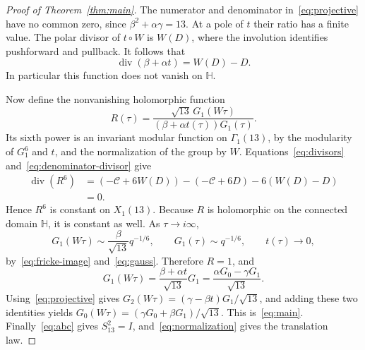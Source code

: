 \documentclass[10pt,a4paper]{amsart}
\newcommand{\HH}{\mathbb H}
\DeclareMathOperator{\divisor}{div}
\begin{document}
\begin{proof}[Proof of Theorem~\ref{thm:main}]
The numerator and denominator in~\eqref{eq:projective} have no common zero, since $\beta^2+\alpha\gamma=13$. At a pole of $t$ their ratio has a finite value. The polar divisor of $t\circ W$ is $W(D)$, where the involution identifies pushforward and pullback. It follows that
\begin{equation}\label{eq:denominator-divisor}
 \divisor(\beta+\alpha t)=W(D)-D.
\end{equation}
In particular this function does not vanish on $\HH$.

Now define the nonvanishing holomorphic function
\[
 R(\tau)=\frac{\sqrt{13}\,G_1(W\tau)}{(\beta+\alpha t(\tau))G_1(\tau)}.
\]
Its sixth power is an invariant modular function on $\Gamma_1(13)$, by the modularity of $G_1^6$ and $t$, and the normalization of the group by $W$. Equations~\eqref{eq:divisors} and~\eqref{eq:denominator-divisor} give
\begin{align*}
 \divisor(R^6)
 &=(-\mathcal C+6W(D))-(-\mathcal C+6D)-6(W(D)-D)\\
 &=0.
\end{align*}
Hence $R^6$ is constant on $X_1(13)$. Because $R$ is holomorphic on the connected domain $\HH$, it is constant as well. As $\tau\to i\infty$,
\[
 G_1(W\tau)\sim\frac{\beta}{\sqrt{13}}q^{-1/6},\qquad
 G_1(\tau)\sim q^{-1/6},\qquad t(\tau)\to0,
\]
by~\eqref{eq:fricke-image} and~\eqref{eq:gauss}. Therefore $R=1$, and
\[
 G_1(W\tau)=\frac{\beta+\alpha t}{\sqrt{13}}G_1
 =\frac{\alpha G_0-\gamma G_1}{\sqrt{13}}.
\]
Using~\eqref{eq:projective} gives
$G_2(W\tau)=(\gamma-\beta t)G_1/\sqrt{13}$, and adding these two identities yields
$G_0(W\tau)=(\gamma G_0+\beta G_1)/\sqrt{13}$.
This is~\eqref{eq:main}. Finally~\eqref{eq:abc} gives $S_{13}^2=I$, and~\eqref{eq:normalization} gives the translation law.
\end{proof}
\end{document}
